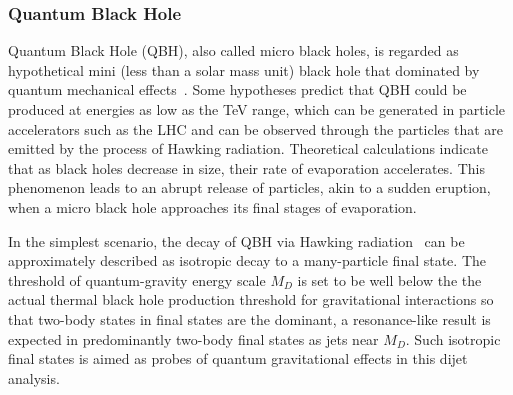 \documentclass[UTF8,12pt]{ctexart}
\numberwithin{equation}{section}
\begin{document}
\subsubsection{Quantum Black Hole}
\label{sec:2.2.3}

Quantum Black Hole (QBH), also called micro black holes, is regarded as hypothetical mini (less than a solar mass unit) black hole that dominated by quantum mechanical effects~\cite{10.1093/mnras/152.1.75}. Some hypotheses predict that QBH could be produced at energies as low as the TeV range, which can be generated in particle accelerators such as the LHC and can be observed through the particles that are emitted by the process of Hawking radiation. Theoretical calculations indicate that as black holes decrease in size, their rate of evaporation accelerates. This phenomenon leads to an abrupt release of particles, akin to a sudden eruption, when a micro black hole approaches its final stages of evaporation.


In the simplest scenario, the decay of QBH via Hawking radiation~\cite{Hawking:1975vcx} can be approximately described as isotropic decay to a many-particle final state.  The threshold of quantum-gravity energy scale $M_D$ is set to be well below the 
the actual thermal black hole production threshold for gravitational interactions so that two-body states in final states are the dominant, a resonance-like result is expected in predominantly two-body final states as jets near $M_D$. Such isotropic final states is aimed as probes of quantum gravitational effects in this dijet analysis.



%
%
%
\end{document}
